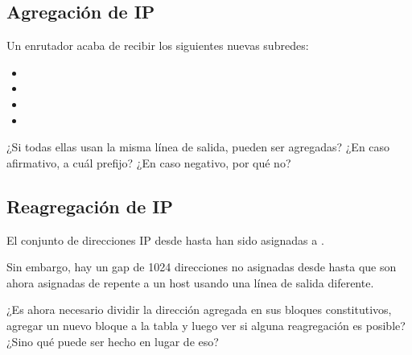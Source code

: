 \documentclass[12pt]{report}
\begin{document}
\begin{exer}
	\subsection{Agregación de IP \stwo \steo}
	Un enrutador acaba de recibir los siguientes nuevas subredes:

	\begin{itemize}
		\item {}
		\item {}
		\item {}
		\item {}
	\end{itemize}

	¿Si todas ellas usan la misma línea de salida, pueden ser agregadas? ¿En caso afirmativo, a cuál prefijo? ¿En caso negativo, por qué no?
\end{exer}

\begin{exer}
	\subsection{Reagregación de IP \sthree \steo}
	El conjunto de direcciones IP desde  hasta  han sido asignadas
	a .

	Sin embargo, hay un gap de 1024 direcciones no asignadas desde  hasta  que son ahora asignadas de repente a un host usando una línea de salida diferente.

	¿Es ahora necesario dividir la dirección agregada en sus bloques constitutivos, agregar un nuevo bloque a la tabla y luego ver si alguna reagregación es posible? ¿Sino qué puede ser hecho en lugar de eso?
\end{exer}
\end{document}
